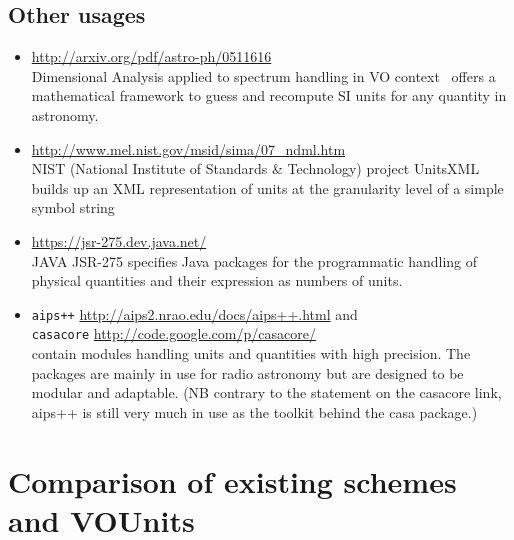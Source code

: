 \documentclass[11pt,notitlepage,onecolumn]{ivoa}
\newcommand{\violet}{\textcolor[rgb]{0.50,0.00,0.50}}
\begin{document}
\subsection{Other usages}

\begin{itemize}
\item
\violet{\footnotesize{\url{http://arxiv.org/pdf/astro-ph/0511616}}}\\ 
Dimensional Analysis applied to spectrum handling in VO context~\citep{osuna05}
offers a mathematical framework to guess and recompute
SI units for any quantity in astronomy.
\item
\violet{\footnotesize{\url{http://www.mel.nist.gov/msid/sima/07_ndml.htm}}}\\
NIST (National Institute of Standards \& Technology) project
UnitsXML builds up an XML representation of units at the granularity
level of a simple symbol string
\item \violet{\footnotesize{\url{https://jsr-275.dev.java.net/}}}\\
JAVA JSR-275 specifies Java packages for the programmatic
handling of physical quantities and their expression as numbers of
units.
\item  \texttt{aips++}
\violet{\footnotesize{\url{http://aips2.nrao.edu/docs/aips++.html}}} and\\
 \texttt{casacore} \violet{\footnotesize{\url{http://code.google.com/p/casacore/}}}\\ contain modules handling units and
quantities with high precision. The packages are mainly in use for
radio astronomy but are designed to be modular and adaptable.  (NB
contrary to the statement on the casacore link, aips++ is still very much in
use as the toolkit behind the {\sc casa} package.)
\end{itemize}

\section{Comparison of existing schemes and VOUnits\label{appx:comparisons}}

\end{document}
